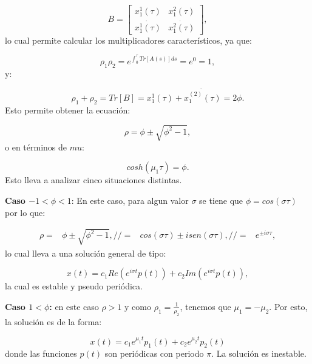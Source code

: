 \documentclass[a4paper,10pt]{report}
\begin{document}
\begin{equation}
B= [\begin{array}{cc}

x_1^1(\tau) & x_1^2(\tau) \\
\dot{x_1^1(\tau)} & \dot{x_1^2(\tau)}

\end{array}],
\end{equation} lo cual permite calcular los multiplicadores característicos, ya que:

\begin{equation}
\rho_1 \rho_2 = e^{\int_0^\tau Tr[A(s)]ds} = e^0 = 1,
\end{equation} y:

\begin{equation}
\rho_1 + \rho_2 = Tr[B] =x_1^1(\tau)+ \dot{x_1^{(2)}(\tau)} = 2\phi.
\end{equation} Esto permite obtener la ecuación:

\begin{equation}
\rho = \phi \pm \sqrt{\phi^2 -1},
\end{equation} o en términos de $mu$:

\begin{equation}
cosh(\mu_1 \tau) = \phi.
\end{equation} Esto lleva a analizar cinco situaciones distintas.

\textbf{Caso $ -1 < \phi < 1$}: En este caso, para algun valor $\sigma$ se tiene que $\phi = cos(\sigma \tau)$ por lo que:

\begin{align*}
\rho =& \phi \pm \sqrt{\phi^2 -1},//
=& cos(\sigma \tau) \pm isen(\sigma \tau), //
=& e^{\pm i\sigma \tau},
\end{align*} lo cual lleva a una solución general de tipo:

\begin{equation}
x(t) = c_1 Re(e^{i\sigma t} p(t)) + c_2 Im(e^{i\sigma t} p(t)),
\end{equation} la cual es estable y pseudo periódica.

\textbf{Caso $1 < \phi$:} en este caso $\rho > 1$ y como $\rho_1 = \frac{1}{\rho_2}$, tenemos que $\mu_1 = -\mu_2$. Por esto, la solución es de la forma:

\begin{equation}
x(t) = c_1 e^{\mu_1 t}p_1(t) + c_2 e^{\mu_2 t}p_2(t)
\end{equation} donde las funciones $p(t)$ son periódicas con periodo $\pi$. La solución es inestable.
\end{document}
